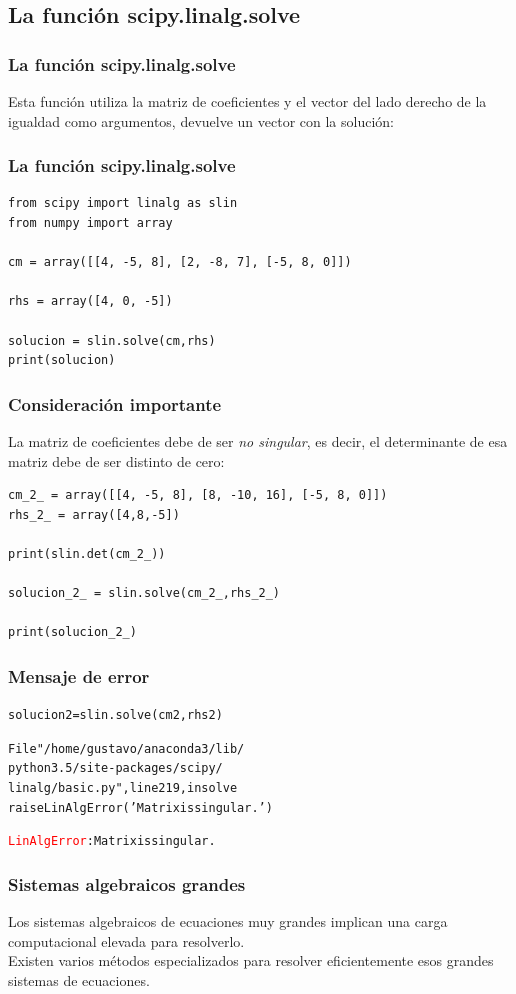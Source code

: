 \subsection{La función scipy.linalg.solve}
\begin{frame}
\frametitle{La función scipy.linalg.solve}
Esta función utiliza la matriz de coeficientes y el vector del lado derecho de la igualdad como argumentos, devuelve un vector con la solución:
\end{frame}
\begin{frame}
\frametitle{La función scipy.linalg.solve}
\begin{lstlisting}[caption=Uso de la funcion \texttt{solve}, style=FormattedNumber, basicstyle=\linespread{1.1}\ttfamily=\small, columns=fullflexible]
from scipy import linalg as slin
from numpy import array

cm = array([[4, -5, 8], [2, -8, 7], [-5, 8, 0]])

rhs = array([4, 0, -5])

solucion = slin.solve(cm,rhs)
print(solucion)
\end{lstlisting}
\end{frame}
\begin{frame}
\frametitle{Consideración importante}
La matriz de coeficientes debe de ser \emph{no singular}, es decir, el determinante de esa matriz debe de ser distinto de cero:
\begin{lstlisting}[caption=El código se interrumpe, style=FormattedNumber, basicstyle=\linespread{1.1}\ttfamily=\small, columns=fullflexible]
cm_2_ = array([[4, -5, 8], [8, -10, 16], [-5, 8, 0]])
rhs_2_ = array([4,8,-5])

print(slin.det(cm_2_))

solucion_2_ = slin.solve(cm_2_,rhs_2_)

print(solucion_2_)
\end{lstlisting}
\end{frame}
\begin{frame}[fragile]
\frametitle{Mensaje de error}
\begin{alltt}
solucion2 = slin.solve(cm2,rhs2)

  File "/home/gustavo/anaconda3/lib/
  		python3.5/site-packages/scipy/
  		linalg/basic.py", line 219, in solve
  raise LinAlgError('Matrix is singular.')

\textcolor{red}{LinAlgError}: Matrix is singular.
\end{alltt}
\end{frame}
\begin{frame}
\frametitle{Sistemas algebraicos grandes}
Los sistemas algebraicos de ecuaciones muy grandes implican una carga computacional elevada para resolverlo.
\\
\bigskip
Existen varios métodos especializados para resolver eficientemente esos grandes sistemas de ecuaciones.
\end{frame}
